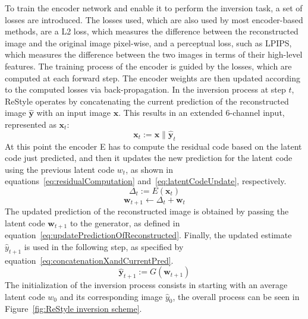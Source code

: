 \noindent To train the encoder network and enable it to perform the inversion task, a set of losses are introduced. The losses used, which are also used by most encoder-based methods, are a L2 loss, which measures the difference between the reconstructed image and the original image pixel-wise, and a perceptual loss, such as LPIPS, which measures the difference between the two images in terms of their high-level features. 
The training process of the encoder is guided by the losses, which are computed at each forward step. The encoder weights are then updated according to the computed losses via back-propagation. In the inversion process at step $t$, ReStyle operates by concatenating the current prediction of the reconstructed image $\hat{\textbf{y}}$ with an input image $\textbf{x}$. This results in an extended \num{6}-channel input, represented as $\textbf{x}_t$:
\begin{equation}
\label{eq:concatenationXandCurrentPred}
    \textbf{x}_t := \textbf{x} \| \hat{\textbf{y}}_t
\end{equation}
At this point the encoder E has to compute the residual code based on the latent code just predicted, and then it updates the new prediction for the latent code using the previous latent code $w_t$, as shown in equations~\ref{eq:residualComputation} and~\ref{eq:latentCodeUpdate}, respectively.
\begin{equation}
    \label{eq:residualComputation}
    \Delta_t := E(\textbf{x}_t)
\end{equation}
\begin{equation}
    \label{eq:latentCodeUpdate}
    \textbf{w}_{t+1} \xleftarrow{} \Delta_t + \textbf{w}_t
\end{equation}
The updated prediction of the reconstructed image is obtained by passing the latent code $\textbf{w}_{t+1}$ to the generator, as defined in equation~\ref{eq:updatePredictionOfReconstructed}. Finally, the updated estimate $\hat{y}_{t+1}$ is used in the following step, as specified by equation~\ref{eq:concatenationXandCurrentPred}.
\begin{equation}
    \label{eq:updatePredictionOfReconstructed}
    \hat{\textbf{y}}_{t+1} := G(\textbf{w}_{t+1})
\end{equation}
The initialization of the inversion process consists in starting with an average latent code $w_0$ and its corresponding image $\hat{y}_0$, the overall process can be seen in Figure~\ref{fig:ReStyle inversion scheme}.
